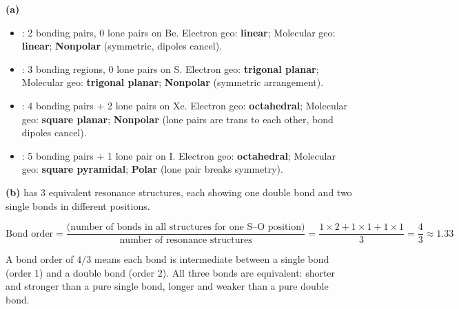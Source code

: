 \documentclass[addpoints]{exam}
\begin{document}
\begin{questions}
\begin{solution}[10cm]
\textbf{(a)}
\begin{itemize}
    \item {}: 2 bonding pairs, 0 lone pairs on Be. Electron geo: \textbf{linear};
    Molecular geo: \textbf{linear}; \textbf{Nonpolar} (symmetric, dipoles cancel).
    \item {}: 3 bonding regions, 0 lone pairs on S. Electron geo: \textbf{trigonal
    planar}; Molecular geo: \textbf{trigonal planar}; \textbf{Nonpolar} (symmetric arrangement).
    \item {}: 4 bonding pairs + 2 lone pairs on Xe. Electron geo: \textbf{octahedral};
    Molecular geo: \textbf{square planar}; \textbf{Nonpolar} (lone pairs are trans to each other,
    bond dipoles cancel).
    \item {}: 5 bonding pairs + 1 lone pair on I. Electron geo: \textbf{octahedral};
    Molecular geo: \textbf{square pyramidal}; \textbf{Polar} (lone pair breaks symmetry).
\end{itemize}

\textbf{(b)}  has 3 equivalent resonance structures, each showing one  double
bond and two  single bonds in different positions.

\[
\text{Bond order} = \frac{\text{(number of bonds in all structures for one S--O position)}}
{\text{number of resonance structures}} = \frac{1\times2 + 1\times1 + 1\times1}{3} = \frac{4}{3}
\approx 1.33
\]

A bond order of $4/3$ means each  bond is intermediate between a single bond (order 1)
and a double bond (order 2). All three bonds are equivalent: shorter and stronger than a pure
single bond, longer and weaker than a pure double bond.
\end{solution}

\end{questions}
\end{document}
